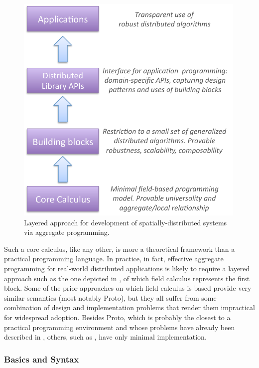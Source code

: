 \documentclass[12pt,a4paper,twoside,openright]{book}
\begin{document}
\begin{figure}
\centering
\includegraphics[width=0.99\textwidth]{img/aggregate-tower}
\caption[Layered approach]{Layered approach for development of spatially-distributed systems via aggregate programming.}
\label{img:researchprogram}
\end{figure}

Such a core calculus, like any other, is more a theoretical framework than a practical programming language.
%
In practice, in fact, effective aggregate programming for real-world distributed applications is likely to require a layered approach such as the one depicted in , of which field calculus represents the first block.
%
Some of the prior approaches on which field calculus is based provide very similar semantics (most notably Proto), but they all suffer from some combination of design and implementation problems that render them impractical for widespread adoption.
%
Besides Proto, which is probably the closest to a practical programming environment and whose problems have already been described in , others, such as \cite{VPB-COORD2012}, have only minimal implementation.

\subsubsection{Basics and Syntax}
\end{document}
